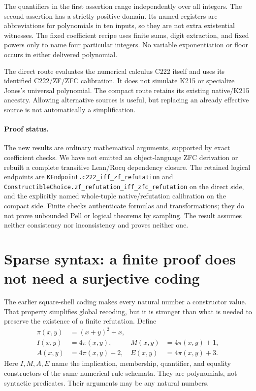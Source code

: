 \documentclass[11pt,letterpaper]{article}
\theoremstyle{remark}\newtheorem{remark}[theorem]{Remark}
\newcommand{\code}[1]{\nolinkurl{#1}}
\begin{document}
The quantifiers in the first assertion range independently over all
integers. The second assertion has a strictly positive domain. Its named
registers are abbreviations for polynomials in ten inputs, so they are not
extra existential witnesses. The fixed coefficient recipe uses finite
sums, digit extraction, and fixed powers only to name four particular
integers. No variable exponentiation or floor occurs in either delivered
polynomial.

The direct route evaluates the numerical calculus C222 itself and uses its
identified C222/ZF/ZFC calibration. It does not simulate K215 or specialize
Jones's universal polynomial. The compact route retains its existing
native/K215 ancestry. Allowing alternative sources is useful, but replacing
an already effective source is not automatically a simplification.

\paragraph{Proof status.}
The new results are ordinary mathematical arguments, supported by exact
coefficient checks. We have not emitted an object-language ZFC derivation
or rebuilt a complete transitive Lean/Rocq dependency closure. The retained
logical endpoints are \code{KEndpoint.c222_iff_zf_refutation} and
\code{ConstructibleChoice.zf_refutation_iff_zfc_refutation} on the direct
side, and the explicitly named whole-tuple native/refutation calibration on
the compact side. Finite checks authenticate formulas and transformations;
they do not prove unbounded Pell or logical theorems by sampling. The result
assumes neither consistency nor inconsistency and proves neither one.

\section{Sparse syntax: a finite proof does not need a surjective coding}
\label{sec:sparse}

The earlier square-shell coding makes every natural number a constructor
value. That property simplifies global recoding, but it is stronger than
what is needed to preserve the existence of a finite refutation. Define
\begin{equation}\label{eq:sparse-constructors}
 \begin{aligned}
 \pi(x,y)&=(x+y)^2+x,\\
 I(x,y)&=4\pi(x,y),& M(x,y)&=4\pi(x,y)+1,\\
 A(x,y)&=4\pi(x,y)+2,& E(x,y)&=4\pi(x,y)+3.
 \end{aligned}
\end{equation}
Here $I,M,A,E$ name the implication, membership, quantifier, and equality
constructors of the same numerical rule schemata. They are polynomials,
not syntactic predicates. Their arguments may be any natural numbers.
\end{document}
